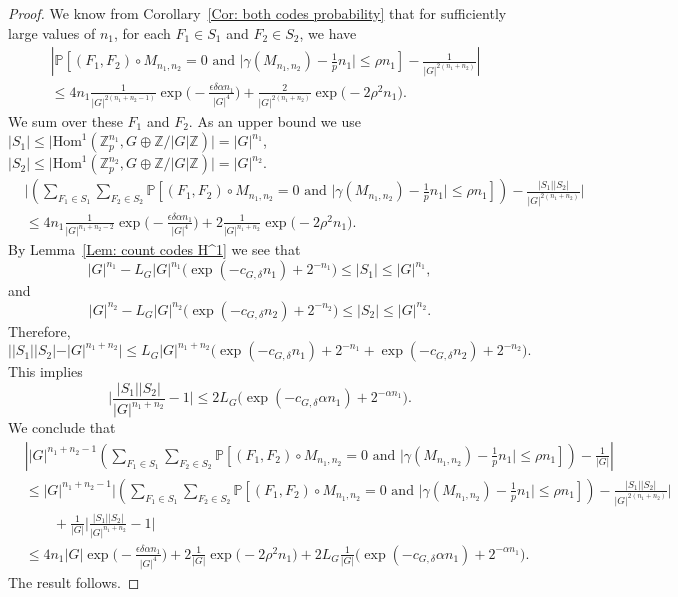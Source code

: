 \documentclass[12pt]{amsart}
\theoremstyle{definition}
\newcommand{\PPP}{\mathbb{P}}
\newcommand{\Mnot}{M_{n_1,n_2}}
\newcommand{\ZG}{\Z/\abs{G}\Z}
\newcommand{\abs}[1]{\vert#1\vert}
\newcommand{\Zp}{\Z_p}
\newcommand{\Z}{\mathbb{Z}}
\newcommand{\Hom}{\text{Hom}}
\begin{document}
\begin{proof}
We know from Corollary~\ref{Cor: both codes probability} that for sufficiently large values of $n_1$, for each $F_1\in S_1$ and $F_2\in S_2$, we have
\begin{align*}
&\left|
\PPP[(F_1,F_2)\circ \Mnot=0 \text{ and }
\abs{\gamma(\Mnot)- \tfrac{1}{p} n_1}\leq \rho n_1] 
- \frac{1}{\abs{G}^{2(n_1+n_2)}}
\right|\\
&\leq 4n_1\frac{1}{\abs{G}^{2(n_1+n_2-1)}} \exp\Big(-\frac{\epsilon\delta \alpha n_1}{|G|^4}\Big)
+ \frac{2}{\abs{G}^{2(n_1+n_2)}} \exp\big(-2\rho^2 n_1\big).
\end{align*}
We sum over these $F_1$ and $F_2$. 
As an upper bound we use $\abs{S_1}\leq \abs{\Hom^1(\Zp^{n_1},G\oplus\ZG)}=\abs{G}^{n_1}$, $\abs{S_2}\leq \abs{\Hom^1(\Zp^{n_2},G\oplus\ZG)}=\abs{G}^{n_2}$.
\begin{align*}
&\Bigg|
\left(
\sum_{F_1\in S_1}
\sum_{F_2\in S_2}
\PPP[(F_1,F_2)\circ \Mnot=0 \text{ and }
\abs{\gamma(\Mnot) -\tfrac{1}{p} n_1}\leq \rho n_1] 
\right)
- \frac{\abs{S_1}\abs{S_2}}{\abs{G}^{2(n_1+n_2)}}
\Bigg|\\
&\leq 4n_1\frac{1}{\abs{G}^{n_1+n_2-2}}  \exp\Big(-\frac{\epsilon\delta \alpha n_1}{|G|^4}\Big)
+ 2\frac{1}{\abs{G}^{n_1+n_2}} \exp\big(-2\rho^2 n_1\big).
\end{align*}
By Lemma~\ref{Lem: count codes H^1} we see that
\[
\abs{G}^{n_1}
-L_G \abs{G}^{n_1}\Big( \exp(-c_{G,\delta}n_1) +2^{-n_1} \Big)
\leq \abs{S_1}
\leq \abs{G}^{n_1},
\]
and
\[
\abs{G}^{n_2}
-L_G \abs{G}^{n_2} \Big( \exp(-c_{G,\delta}n_2) +2^{-n_2} \Big)
\leq \abs{S_2}
\leq \abs{G}^{n_2}.
\]
Therefore,
\[
\Big|
\abs{S_1}
\abs{S_2}
-\abs{G}^{n_1+n_2}
\Big|\leq L_G \abs{G}^{n_1+n_2} 
\Big(\exp(-c_{G,\delta}n_1)+ 2^{-n_1}+ \exp(-c_{G,\delta}n_2) +2^{-n_2}\Big).
\]
This implies
\[
\bigg|
\frac{\abs{S_1}
\abs{S_2}}{\abs{G}^{n_1+n_2}}
-1
\bigg|
\leq 2 L_G \Big(\exp(-c_{G,\delta}\alpha n_1) +2^{-\alpha n_1} \Big).
\]
We conclude that
\begin{align*}
&\left|
\abs{G}^{n_1+n_2-1}\left(
\sum_{F_1\in S_1}
\sum_{F_2\in S_2}
\PPP[(F_1,F_2)\circ \Mnot=0 \text{ and }
\abs{\gamma(\Mnot) -\tfrac{1}{p} n_1}\leq \rho n_1] 
\right)
- \frac{1}{\abs{G}}
\right|\\
&\leq \abs{G}^{n_1+n_2-1}
\Bigg|
\left(
\sum_{F_1\in S_1}
\sum_{F_2\in S_2}
\PPP[(F_1,F_2)\circ \Mnot=0 \text{ and }
\abs{\gamma(\Mnot) -\tfrac{1}{p} n_1}\leq \rho n_1] 
\right)
- \frac{\abs{S_1}\abs{S_2}}{\abs{G}^{2(n_1+n_2)}}
\Bigg|\\
&\quad\quad+\frac{1}{\abs{G}}
\bigg|
\frac{\abs{S_1}
\abs{S_2}}{\abs{G}^{n_1+n_2}}
-1
\bigg|\\
&\leq 4n_1 \abs{G} \exp\Big(-\frac{\epsilon\delta \alpha n_1}{|G|^4}\Big)
+ 2\frac{1}{\abs{G}} \exp\big(-2\rho^2 n_1\big)
+2L_G \frac{1}{\abs{G}}  \Big(\exp(-c_{G,\delta}\alpha n_1) +2^{-\alpha n_1} \Big).
\end{align*}
The result follows.
\end{proof}
\end{document}
